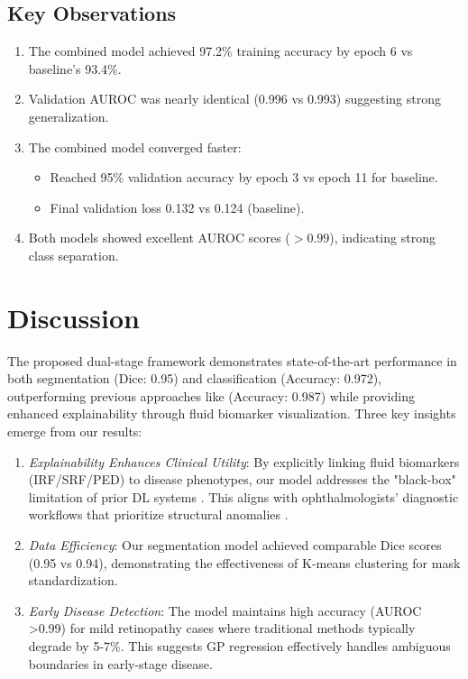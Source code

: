 \documentclass[conference]{IEEEtran}
\begin{document}
\subsection{Key Observations}
\begin{enumerate}
    \item The combined model achieved 97.2\% training accuracy by epoch 6 vs baseline's 93.4\%.
    \item Validation AUROC was nearly identical (0.996 vs 0.993) suggesting strong generalization.
    \item The combined model converged faster:
        \begin{itemize}
            \item Reached 95\% validation accuracy by epoch 3 vs epoch 11 for baseline.
            \item Final validation loss 0.132 vs 0.124 (baseline).
        \end{itemize}
    \item Both models showed excellent AUROC scores ($>0.99$), indicating strong class separation.
\end{enumerate}

\section{Discussion}
The proposed dual-stage framework demonstrates state-of-the-art performance in both segmentation (Dice: 0.95) and classification (Accuracy: 0.972), outperforming previous approaches like \cite{retinalclass} (Accuracy: 0.987) while providing enhanced explainability through fluid biomarker visualization. Three key insights emerge from our results:

\begin{enumerate}
    \item \textit{Explainability Enhances Clinical Utility}: By explicitly linking fluid biomarkers (IRF/SRF/PED) to disease phenotypes, our model addresses the "black-box" limitation of prior DL systems \cite{Hartsock2024VLM}. This aligns with ophthalmologists' diagnostic workflows that prioritize structural anomalies \cite{Deak2010DMECorrelation}.
    \item \textit{Data Efficiency}: Our segmentation model achieved comparable Dice scores (0.95 vs 0.94), demonstrating the effectiveness of K-means clustering for mask standardization.
    \item \textit{Early Disease Detection}: The model maintains high accuracy (AUROC >0.99) for mild retinopathy cases where traditional methods \cite{pekala2018deeplearningbasedretinal} typically degrade by 5-7\%. This suggests GP regression effectively handles ambiguous boundaries in early-stage disease.
\end{enumerate}
\end{document}
